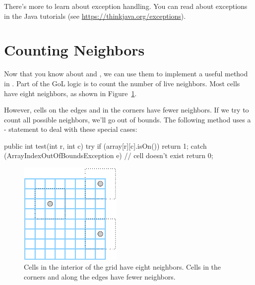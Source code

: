 There's more to learn about exception handling.
You can read about exceptions in the Java tutorials (see \url{https://thinkjava.org/exceptions}).


\section{Counting Neighbors}


Now that you know about  and , we can use them to implement a useful method in .
Part of the GoL logic is to count the number of live neighbors.
Most cells have eight neighbors, as shown in Figure~\ref{fig:neighbors}.

However, cells on the edges and in the corners have fewer neighbors.
If we try to count all possible neighbors, we'll go out of bounds.
The following method uses a - statement to deal with these special cases:

\begin{code}
public int test(int r, int c) {
    try {
        if (array[r][c].isOn()) {
            return 1;
        }
    } catch (ArrayIndexOutOfBoundsException e) {
        // cell doesn't exist
    }
    return 0;
}
\end{code}

\begin{figure}[!ht]
\begin{center}
\includegraphics[height=140pt]{figs/grid.pdf}
\caption{Cells in the interior of the grid have eight neighbors.
Cells in the corners and along the edges have fewer neighbors.}
\label{fig:neighbors}
\end{center}
\end{figure}

